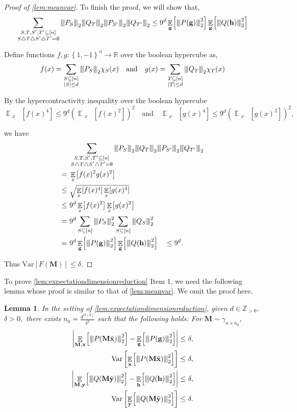 \documentclass[10pt,a4paper]{article}
\theoremstyle{plain}
\newtheorem{lemma}[theorem]{Lemma}
\theoremstyle{definition}
\newcommand {\minusspace} {\: \! \!}
\newcommand {\Fn} [2] {\ensuremath{ #1 \minusspace \Br{ #2 } }}
\newcommand{\reals}{{\mathbb R}}
\newcommand {\set} [1] {\ensuremath{ \left\lbrace #1 \right\rbrace }}
\newcommand {\br} [1] {\ensuremath{ \left( #1 \right) }}
\newcommand {\Br} [1] {\ensuremath{ \left[ #1 \right] }}
\newcommand {\ab} [1] {\ensuremath{ \left| #1 \right| }}
\DeclareMathOperator*{\bigE}{\mathbb{E}}
\newcommand {\expec} [2] {\Fn{\bigE_{\substack{#1}}}{#2}}
\newcommand{\nnorm}[1]{{\left\vert\kern-0.25ex\left\vert\kern-0.25ex\left\vert #1
		\right\vert\kern-0.25ex\right\vert\kern-0.25ex\right\vert}}
\newcommand{\posint}{{\mathbb Z}_{>0}}
\newcommand{\randg}{\ensuremath{\mathbf{g}}}
\newcommand{\randh}{\ensuremath{\mathbf{h}}}
\newcommand{\randx}{\ensuremath{\mathbf{x}}}
\newcommand{\randy}{\ensuremath{\mathbf{y}}}
\newcommand{\randM}{\ensuremath{\mathbf{M}}}
\newcommand {\var} [1] {\mathrm{Var}\Br{#1}}
\newcommand{\1}{\mathbb{1}} %
\begin{document}
\begin{proof}[Proof of \cref{lem:meanvar}]
To finish the proof, we will show that,
\[\sum_{\substack{S,T,S',T'\subseteq[n]\\ S\bigtriangleup T\bigtriangleup S'\bigtriangleup T'=\emptyset}}\nnorm{ P_S}_2\nnorm{ Q_T}_2\nnorm{ P_{S'}}_2\nnorm{ Q_{T'}}_2\leq9^d\expec{\randg}{\nnorm{P(\randg)}_2^2}\expec{\randg}{\nnorm{Q(\randh)}_2^2}\]

Define functions $f,g:\set{1,-1}^n\rightarrow\reals$ over the boolean hypercube as,
\[f(x)=\sum_{\substack{S\subseteq[n]\\\ab{S}\leq d}}\nnorm{ P_S}_2\chi_S(x)\quad\text{and}\quad g(x)=\sum_{\substack{T\subseteq[n]\\\ab{T}\leq d}}\nnorm{ Q_T}_2\chi_T(x)\]

By the hypercontractivity inequality over the boolean hypercube \cite[Page 240]{Odonnell08}
\[\expec{x}{f(x)^4}\leq9^d\br{\expec{x}{f(x)^2}}^2\quad\text{and}\quad\expec{x}{g(x)^4}\leq9^d\br{\expec{x}{g(x)^2}}^2,\]

we have
\begin{align*}
&\sum_{\substack{S,T,S',T'\subseteq[n]\\ S\bigtriangleup T\bigtriangleup S'\bigtriangleup T'=\emptyset}}\nnorm{ P_S}_2\nnorm{ Q_T}_2\nnorm{ P_{S'}}_2\nnorm{ Q_{T'}}_2\\
=~&\expec{x}{f(x)^2g(x)^2}\\
\leq~&\sqrt{\expec{x}{f(x)^4}\expec{x}{g(x)^4}}\\
\leq~&9^d\expec{x}{f(x)^2}\expec{x}{g(x)^2}\\
=~&9^d\sum_{S\subseteq[n]}\nnorm{ P_S}_2^2\sum_{S\subseteq[n]}\nnorm{ Q_S}_2^2\\
=~&9^d\expec{\randg}{\nnorm{P(\randg)}_2^2}\expec{\randg}{\nnorm{Q(\randh)}_2^2}\quad \leq9^d.
\end{align*}

Thus $\var{F(\mathbf{M})}\leq\delta.$
\end{proof}

To prove \cref{lem:expectationdimensionreduction} Item 1, we need the following lemma whose proof is similar to that of \cref{lem:meanvar}. We omit the proof here.

\begin{lemma}\label{lem:normmeanvar}
In the setting of \cref{lem:expectationdimensionreduction}, given $d\in\posint,$ $\delta>0,$ there exists $n_0=\frac{d^{O(d)}}{\delta^2}$ such that the following holds: For $\mathbf{M}\sim\gamma_{n\times n_0}$,
\begin{align*}
\ab{\expec{\randM,\randx}{\nnorm{P(\randM\tilde{\randx})}_2^2}-\expec{\randg}{\nnorm{P(\randg)}_2^2}}\leq~&\delta,\\
\var{\expec{\randx}{\nnorm{P(\randM\tilde{\randx})}_2^2}}\leq~&\delta,\\
\ab{\expec{\randM,\randy}{\nnorm{Q(\randM\tilde{\randy})}_2^2}-\expec{\randh}{\nnorm{Q(\randh)}_2^2}}\leq~&\delta,\\
\var{\expec{\randy}{\nnorm{Q(\randM\tilde{\randy})}_2^2}}\leq~&\delta.
\end{align*}
\end{lemma}
\end{document}
